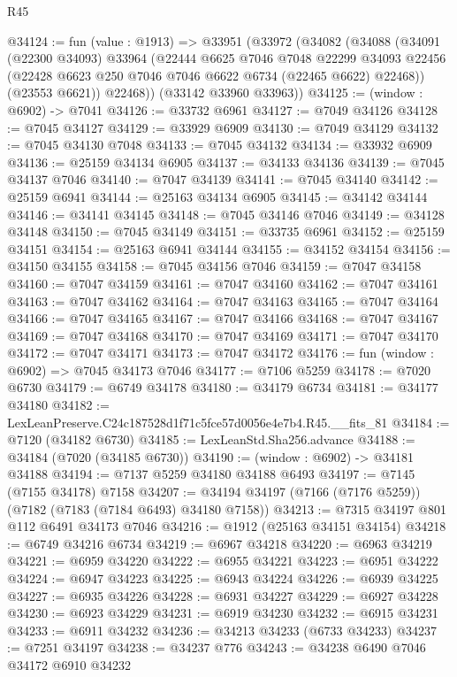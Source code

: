 \begin{lexlean}{R45}
\begin{coremodule}
{@34124 := fun (value : @1913) =>
  @33951
    (@33972
      (@34082
        (@34088
          (@34091
            (@22300 @34093)
            @33964
            (@22444
              @6625
              @7046
              @7048
              @22299
              @34093
              @22456
              (@22428 @6623 @250 @7046 @7046 @6622 @6734 (@22465 @6622) @22468))
            (@23553 @6621))
          @22468))
      (@33142 @33960 @33963))
@34125 := (window : @6902) -> @7041
@34126 := @33732 @6961
@34127 := @7049 @34126
@34128 := @7045 @34127
@34129 := @33929 @6909
@34130 := @7049 @34129
@34132 := @7045 @34130 @7048
@34133 := @7045 @34132
@34134 := @33932 @6909
@34136 := @25159 @34134 @6905
@34137 := @34133 @34136
@34139 := @7045 @34137 @7046
@34140 := @7047 @34139
@34141 := @7045 @34140
@34142 := @25159 @6941
@34144 := @25163 @34134 @6905
@34145 := @34142 @34144
@34146 := @34141 @34145
@34148 := @7045 @34146 @7046
@34149 := @34128 @34148
@34150 := @7045 @34149
@34151 := @33735 @6961
@34152 := @25159 @34151
@34154 := @25163 @6941 @34144
@34155 := @34152 @34154
@34156 := @34150 @34155
@34158 := @7045 @34156 @7046
@34159 := @7047 @34158
@34160 := @7047 @34159
@34161 := @7047 @34160
@34162 := @7047 @34161
@34163 := @7047 @34162
@34164 := @7047 @34163
@34165 := @7047 @34164
@34166 := @7047 @34165
@34167 := @7047 @34166
@34168 := @7047 @34167
@34169 := @7047 @34168
@34170 := @7047 @34169
@34171 := @7047 @34170
@34172 := @7047 @34171
@34173 := @7047 @34172
@34176 := fun (window : @6902) => @7045 @34173 @7046
@34177 := @7106 @5259
@34178 := @7020 @6730
@34179 := @6749 @34178
@34180 := @34179 @6734
@34181 := @34177 @34180
@34182 := LexLeanPreserve.C24c187528d1f71c5fce57d0056e4e7b4.R45.__fits_81
@34184 := @7120 (@34182 @6730)
@34185 := LexLeanStd.Sha256.advance
@34188 := @34184 (@7020 (@34185 @6730))
@34190 := (window : @6902) -> @34181 @34188
@34194 := @7137 @5259 @34180 @34188 @6493
@34197 := @7145 (@7155 @34178) @7158
@34207 := @34194 @34197 (@7166 (@7176 @5259)) (@7182 (@7183 (@7184 @6493) @34180 @7158))
@34213 := @7315 @34197 @801 @112 @6491 @34173 @7046
@34216 := @1912 (@25163 @34151 @34154)
@34218 := @6749 @34216 @6734
@34219 := @6967 @34218
@34220 := @6963 @34219
@34221 := @6959 @34220
@34222 := @6955 @34221
@34223 := @6951 @34222
@34224 := @6947 @34223
@34225 := @6943 @34224
@34226 := @6939 @34225
@34227 := @6935 @34226
@34228 := @6931 @34227
@34229 := @6927 @34228
@34230 := @6923 @34229
@34231 := @6919 @34230
@34232 := @6915 @34231
@34233 := @6911 @34232
@34236 := @34213 @34233 (@6733 @34233)
@34237 := @7251 @34197
@34238 := @34237 @776
@34243 := @34238 @6490 @7046 @34172 @6910 @34232
}
\end{coremodule}
\end{lexlean}
